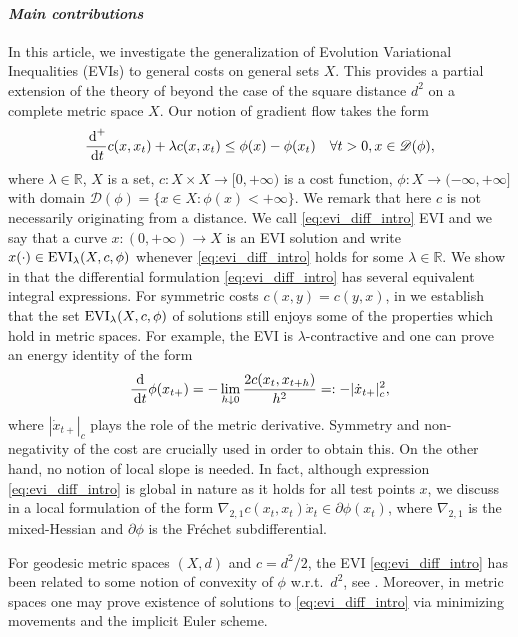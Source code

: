 \documentclass[reqno]{amsart}
\theoremstyle{plain}
\theoremstyle{remark}
\theoremstyle{plain}
\numberwithin{equation}{section}
\theoremstyle{remark}
\newcommand{\R}{\mathbb{R}}
\newcommand{\de}{{\,\rm d}}
\newcommand{\dom}[1]{\mathscr{D}(#1)}
\DeclareMathOperator{\EVI}{{\rm EVI}}
\begin{document}
\paragraph{\em\bfseries Main contributions} In this article, we   investigate the generalization of  Evolution Variational Inequalities (EVIs)  to general costs  on general sets $X$.  This provides a partial extension of the theory of 
\cite{MuratoriSavare}  beyond  the case of the  square distance $d^2$ on a complete metric space $X$. Our  notion of   gradient flow takes the form
\begin{equation}
	\frac{\de^+}{\de t} c(x,x_t) + \lambda c(x,x_t) \le \phi(x)-\phi(x_t) \quad \forall t>0,  x \in \dom{\phi},    \label{eq:evi_diff_intro}
\end{equation}
where  $\lambda\in\R$, $X$ is a set, $c:X\times X\to [0,+\infty)$  is a cost function, $\phi:X\to (-\infty,+\infty]$  with   domain $\dom{\phi}  =\{x\in X : \phi(x)<+\infty \}$. We remark that here $c$ is not necessarily originating from a distance. We call \eqref{eq:evi_diff_intro} EVI and we say that a curve $x:(0,+\infty)\to X$ is an EVI solution and write  
$x(\cdot) \in \EVI_\lambda(X,c, \phi)$ whenever  \eqref{eq:evi_diff_intro} holds for some $\lambda\in\R$. We show in  that the differential formulation \eqref{eq:evi_diff_intro} has several equivalent integral expressions.   For symmetric costs $c(x,y)=c(y,x)$, in  we establish that the set $\EVI_\lambda(X,c, \phi)$ of solutions still  enjoys  some of the properties which hold  in metric spaces.  For example, the  EVI  is $\lambda$-contractive and one can prove an energy identity of the form 
    \begin{equation}\label{eq:energy_identity_intro}
	\frac{\de}{\de t}\phi(x_{t+})=-\lim_{h\downarrow 0}\frac{2c(x_t,x_{t+h})}{h^2} =: -  |\dot x_{t+ }|_c^2  ,  
\end{equation}
where $|\dot x_{t+ }|_c$ plays the role of the metric derivative. Symmetry and non-negativity of the cost  are crucially used in order to obtain this. On the other hand, no notion of local slope is  needed.   
 In fact, although  expression \eqref{eq:evi_diff_intro} is global in nature  as it holds for all test points $x$, we discuss in  a local formulation of the form  
$\nabla_{2,1} c(x_{t}, x_{t})\dot x_{t} \in \partial \phi(x_{t})$, where $\nabla_{2,1}$ is the mixed-Hessian and $\partial \phi$ is the Fr\'echet subdifferential. 

For geodesic metric spaces $(X,d)$ and $c={d^2}/{2}$, the EVI \eqref{eq:evi_diff_intro}  has been related to some notion of  
convexity of $\phi$ w.r.t.\ $d^2$,  see  \cite[Section 3.3]{MuratoriSavare}.  Moreover, in metric spaces one may prove existence of solutions to \eqref{eq:evi_diff_intro} via  minimizing movements and  the  implicit Euler  scheme.  
\end{document}

